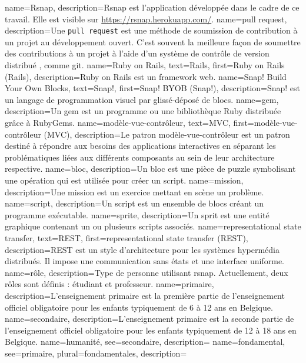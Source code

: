 

{
 name=Rsnap,
 description={Rsnap \cite{rsnap} est l'application développée dans le cadre de ce travail. Elle est visible sur \url{https://rsnap.herokuapp.com/}.}
}
{
 name={pull request},
 description={Une \texttt{pull request} est une méthode de soumission de contribution à un projet au développement ouvert. C'est  souvent la meilleure façon de soumettre des contributions à un projet à l'aide d'un système de contrôle de version distribué , comme git.}
}
{
 name={Ruby on Rails},
 text={Rails},
 first={Ruby on Rails (Rails)},
 description={Ruby on Rails \cite{rails} est un framework web.}
}
{
 name={Snap! Build Your Own Blocks},
 text={Snap!},
 first={Snap! BYOB (Snap!)},
 description={Snap! \cite{snap} est un langage de programmation visuel par glissé-déposé de \glspl{bloc}.}
}
{
 name={gem},
 description={Un gem \cite{gem} est un programme ou une bibliothèque Ruby distribuée grâce à RubyGems.}
}
{
 name={modèle-vue-contrôleur},
 text={MVC},
 first={modèle-vue-contrôleur (MVC)},
 description={Le patron modèle-vue-contrôleur \cite{wiki-mvc} est un patron destiné à répondre aux besoins des applications interactives en séparant les problématiques liées aux différents composants au sein de leur architecture respective.}
}
{
 name={bloc},
 description={Un bloc est une pièce de puzzle symbolisant une opération qui est utilisée pour créer un \gls{script}.}
}
{
 name={mission},
 description={Une mission est un exercice mettant en scène un problème.}
}
{
 name={script},
 description={Un script est un ensemble de blocs créant un programme exécutable.}
}
{
 name={sprite},
 description={Un sprit est une entité graphique contenant un ou plusieurs scripts associés.}
}
{
 name={representational state transfer},
 text={REST},
 first={representational state transfer (REST)},
 description={REST est un style d’architecture pour les systèmes hypermédia distribués. Il impose une communication sans états et une interface uniforme.}
}
{
 name={rôle},
 description={Type de personne utilisant \gls{rsnap}. Actuellement, deux rôles sont définis : étudiant et professeur.}
}
{
 name={primaire},
 description={L'enseignement primaire est la première partie de l'enseignement officiel obligatoire pour les enfants typiquement de 6 à 12 ans en Belgique.}
}
{
 name={secondaire},
 description={L'enseignement primaire est la seconde partie de l'enseignement officiel obligatoire pour les enfants typiquement de 12 à 18 ans en Belgique.}
}
{
 name={humanité},
 see=secondaire,
 description={}
}
{
 name={fondamental},
 see=primaire,
 plural={fondamentales},
 description={}
}
